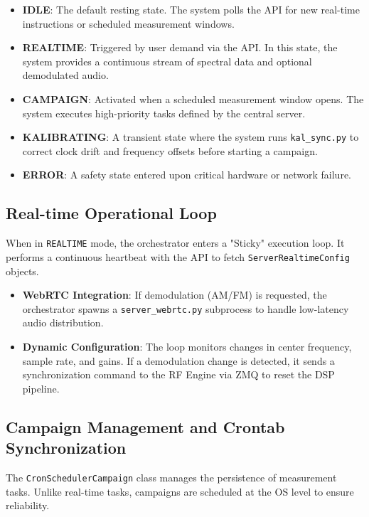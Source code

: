 \documentclass{article}
\begin{document}
\begin{itemize}
    \item \textbf{IDLE}: The default resting state. The system polls the API for new real-time instructions or scheduled measurement windows.
    \item \textbf{REALTIME}: Triggered by user demand via the API. In this state, the system provides a continuous stream of spectral data and optional demodulated audio.
    \item \textbf{CAMPAIGN}: Activated when a scheduled measurement window opens. The system executes high-priority tasks defined by the central server.
    \item \textbf{KALIBRATING}: A transient state where the system runs \texttt{kal\_sync.py} to correct clock drift and frequency offsets before starting a campaign.
    \item \textbf{ERROR}: A safety state entered upon critical hardware or network failure.
\end{itemize}



\subsection{Real-time Operational Loop}
When in \texttt{REALTIME} mode, the orchestrator enters a "Sticky" execution loop. It performs a continuous heartbeat with the API to fetch \texttt{ServerRealtimeConfig} objects.

\begin{itemize}
    \item \textbf{WebRTC Integration}: If demodulation (AM/FM) is requested, the orchestrator spawns a \texttt{server\_webrtc.py} subprocess to handle low-latency audio distribution.
    \item \textbf{Dynamic Configuration}: The loop monitors changes in center frequency, sample rate, and gains. If a demodulation change is detected, it sends a synchronization command to the RF Engine via ZMQ to reset the DSP pipeline.
\end{itemize}

\subsection{Campaign Management and Crontab Synchronization}
The \texttt{CronSchedulerCampaign} class manages the persistence of measurement tasks. Unlike real-time tasks, campaigns are scheduled at the OS level to ensure reliability.
\end{document}
